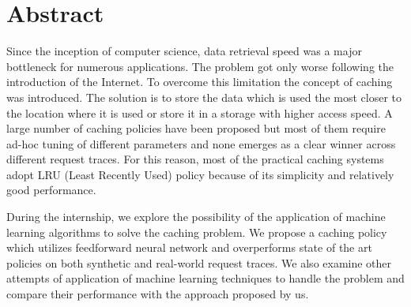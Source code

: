 
\section{Abstract}
Since the inception of computer science, data retrieval speed was a major bottleneck for numerous applications. The problem got only worse following the introduction of the Internet. To overcome this limitation the concept of caching was introduced. The solution is to store the data which is used the most closer to the location where it is used or store it in a storage with higher access speed. A large number of caching policies have been proposed but most of them require ad-hoc tuning of different parameters and none emerges as a clear winner across different request traces. For this reason, most of the practical caching systems adopt LRU (Least Recently Used) policy because of its simplicity and relatively good performance.

During the internship, we explore the possibility of the application of machine learning algorithms to solve the caching problem. We propose a caching policy which utilizes feedforward neural network and overperforms state of the art policies on both synthetic and real-world request traces. We also examine other attempts of application of machine learning techniques to handle the problem and compare their performance with the approach proposed by us.
